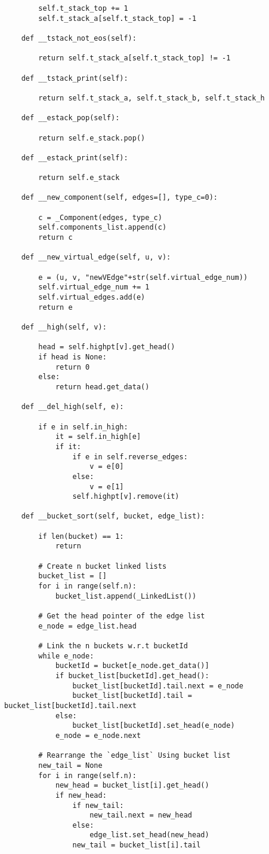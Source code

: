 \begin{verbatim}
		self.t_stack_top += 1
		self.t_stack_a[self.t_stack_top] = -1

	def __tstack_not_eos(self):

		return self.t_stack_a[self.t_stack_top] != -1

	def __tstack_print(self):

		return self.t_stack_a, self.t_stack_b, self.t_stack_h

	def __estack_pop(self):

		return self.e_stack.pop()

	def __estack_print(self):

		return self.e_stack

	def __new_component(self, edges=[], type_c=0):

		c = _Component(edges, type_c)
		self.components_list.append(c)
		return c

	def __new_virtual_edge(self, u, v):

		e = (u, v, "newVEdge"+str(self.virtual_edge_num))
		self.virtual_edge_num += 1
		self.virtual_edges.add(e)
		return e

	def __high(self, v):

		head = self.highpt[v].get_head()
		if head is None:
			return 0
		else:
			return head.get_data()

	def __del_high(self, e):

		if e in self.in_high:
			it = self.in_high[e]
			if it:
				if e in self.reverse_edges:
					v = e[0]
				else:
					v = e[1]
				self.highpt[v].remove(it)

	def __bucket_sort(self, bucket, edge_list):

		if len(bucket) == 1:
			return

		# Create n bucket linked lists
		bucket_list = []
		for i in range(self.n):
			bucket_list.append(_LinkedList())

		# Get the head pointer of the edge list
		e_node = edge_list.head

		# Link the n buckets w.r.t bucketId
		while e_node:
			bucketId = bucket[e_node.get_data()]
			if bucket_list[bucketId].get_head():
				bucket_list[bucketId].tail.next = e_node
				bucket_list[bucketId].tail = bucket_list[bucketId].tail.next
			else:
				bucket_list[bucketId].set_head(e_node)
			e_node = e_node.next

		# Rearrange the `edge_list` Using bucket list
		new_tail = None
		for i in range(self.n):
			new_head = bucket_list[i].get_head()
			if new_head:
				if new_tail:
					new_tail.next = new_head
				else:
					edge_list.set_head(new_head)
				new_tail = bucket_list[i].tail


\end{verbatim}
